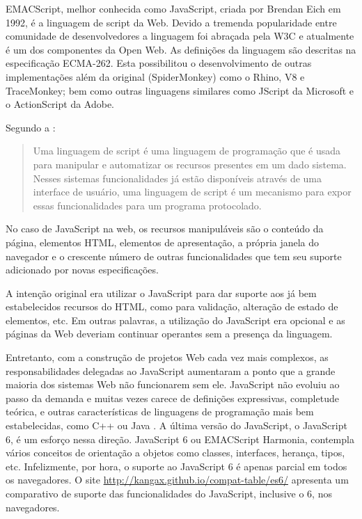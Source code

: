 EMACScript, melhor conhecida como JavaScript, criada por Brendan
Eich em 1992, é a linguagem de script da Web. Devido a tremenda
popularidade entre comunidade de desenvolvedores a linguagem foi
abraçada pela W3C e atualmente é um dos componentes da Open Web. As
definições da linguagem são descritas na especificação ECMA-262.
Esta possibilitou o desenvolvimento de outras implementações além da
original (SpiderMonkey) como o Rhino, V8 e TraceMonkey; bem como outras
linguagens similares como JScript da Microsoft e o ActionScript da
Adobe.

Segundo a \citet{ecmaSpecificaton}:
\begin{quote}
Uma linguagem de script é uma linguagem de programação que é
usada para manipular e automatizar os recursos presentes em um dado
sistema. Nesses sistemas funcionalidades já estão disponíveis
através de uma interface de usuário, uma linguagem de script é
um mecanismo para expor essas funcionalidades para um programa
protocolado.
\end{quote}

No caso de JavaScript na web, os recursos manipuláveis são o conteúdo
da página, elementos HTML, elementos de apresentação, a própria
janela do navegador e o crescente número de outras funcionalidades que
tem seu suporte adicionado por novas especificações.

A intenção original era utilizar o JavaScript para dar suporte aos já
bem estabelecidos recursos do HTML, como para validação, alteração
de estado de elementos, etc. Em outras palavras, a utilização do
JavaScript era opcional e as páginas da Web deveriam continuar
operantes sem a presença da linguagem.

Entretanto, com a construção de projetos Web cada vez mais
complexos, as responsabilidades delegadas ao JavaScript aumentaram a
ponto que a grande maioria dos sistemas Web não funcionarem sem ele.
JavaScript não evoluiu ao passo da demanda e muitas vezes carece de
definições expressivas, completude teórica, e outras características
de linguagens de programação mais bem estabelecidas, como C++ ou
Java \autocite{crossPlatformMobileGame}. A última versão do JavaScript, o
JavaScript 6, é um esforço nessa direção. JavaScript 6 ou EMACScript
Harmonia, contempla vários conceitos de orientação a objetos como
classes, interfaces, herança, tipos, etc. Infelizmente, por hora, o suporte
ao JavaScript 6 é apenas parcial em todos os navegadores. O site
\url{http://kangax.github.io/compat-table/es6/} apresenta um comparativo de
suporte das funcionalidades do JavaScript, inclusive o 6, nos navegadores.


